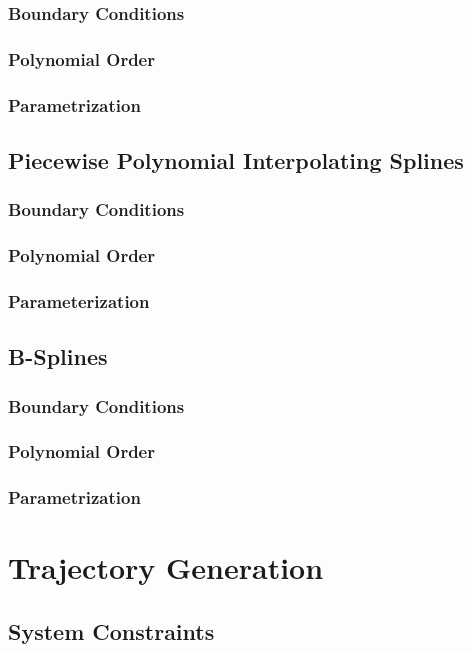\subsubsection{Boundary Conditions}
\subsubsection{Polynomial Order}
\subsubsection{Parametrization}
\subsection{Piecewise Polynomial Interpolating Splines}
\subsubsection{Boundary Conditions}
\subsubsection{Polynomial Order}
\subsubsection{Parameterization}
\subsection{B-Splines}
\subsubsection{Boundary Conditions}
\subsubsection{Polynomial Order}
\subsubsection{Parametrization}

\section{Trajectory Generation}
\label{sec:trajectoryGeneration}
\subsection{System Constraints}
